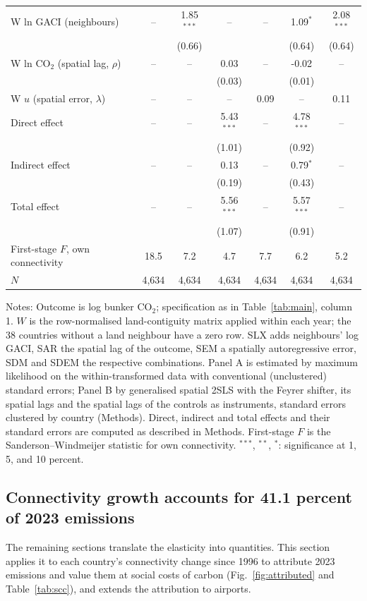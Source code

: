 \documentclass[12pt]{extarticle}
\begin{document}
\begin{table}[H]
{\begin{threeparttable}
\begin{tabular}{lcccccc}
  W ln GACI (neighbours) & -- & 1.85$^{***}$ & -- & -- & 1.09$^{*}$ & 2.08$^{***}$ \\
   &  & (0.66) &  &  & (0.64) & (0.64) \\
  W ln CO$_2$ (spatial lag, $\rho$) & -- & -- & 0.03 & -- & -0.02 & -- \\
   &  &  & (0.03) &  & (0.01) &  \\
  W $u$ (spatial error, $\lambda$) & -- & -- & -- & 0.09 & -- & 0.11 \\
  Direct effect & -- & -- & 5.43$^{***}$ & -- & 4.78$^{***}$ & -- \\
   &  &  & (1.01) &  & (0.92) &  \\
  Indirect effect & -- & -- & 0.13 & -- & 0.79$^{*}$ & -- \\
   &  &  & (0.19) &  & (0.43) &  \\
  Total effect & -- & -- & 5.56$^{***}$ & -- & 5.57$^{***}$ & -- \\
   &  &  & (1.07) &  & (0.91) &  \\
  First-stage $F$, own connectivity & 18.5 & 7.2 & 4.7 & 7.7 & 6.2 & 5.2 \\
  $N$ & 4,634 & 4,634 & 4,634 & 4,634 & 4,634 & 4,634 \\
\bottomrule
\end{tabular}
\begin{tablenotes}[flushleft]
\footnotesize
\item Notes: Outcome is log bunker CO$_2$; specification as in Table~\ref{tab:main}, column 1. $W$ is the row-normalised land-contiguity matrix applied within each year; the 38 countries without a land neighbour have a zero row. SLX adds neighbours' log GACI, SAR the spatial lag of the outcome, SEM a spatially autoregressive error, SDM and SDEM the respective combinations. Panel A is estimated by maximum likelihood on the within-transformed data with conventional (unclustered) standard errors; Panel B by generalised spatial 2SLS with the Feyrer shifter, its spatial lags and the spatial lags of the controls as instruments, standard errors clustered by country (Methods). Direct, indirect and total effects and their standard errors are computed as described in Methods. First-stage $F$ is the Sanderson--Windmeijer statistic for own connectivity. $^{***}$, $^{**}$, $^{*}$: significance at 1, 5, and 10 percent.
\end{tablenotes}
\end{threeparttable}}
\end{table}

\subsection*{Connectivity growth accounts for 41.1 percent of 2023
emissions}
The remaining sections translate the elasticity into quantities. This
section applies it to each country's connectivity change since 1996 to
attribute 2023 emissions and value them at social costs of carbon
(Fig.~\ref{fig:attributed} and Table~\ref{tab:scc}), and extends the
attribution to airports.
\end{document}
